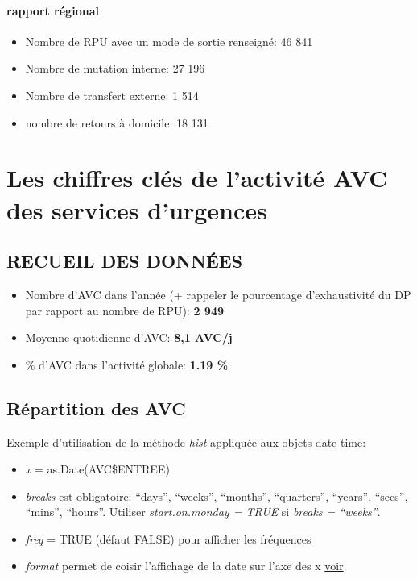 \documentclass[]{article}
\begin{document}
\paragraph{rapport régional}\label{rapport-regional}

\begin{itemize}
\itemsep1pt\parskip0pt
\item
  Nombre de RPU avec un mode de sortie renseigné: 46 841
\item
  Nombre de mutation interne: 27 196
\item
  Nombre de transfert externe: 1 514
\item
  nombre de retours à domicile: 18 131
\end{itemize}

\section{Les chiffres clés de l'activité AVC des services
d'urgences}\label{les-chiffres-cles-de-lactivite-avc-des-services-durgences}

\subsection{RECUEIL DES DONNÉES}\label{recueil-des-donnees-3}

\begin{itemize}
\itemsep1pt\parskip0pt
\item
  Nombre d'AVC dans l'année (+ rappeler le pourcentage d'exhaustivité du
  DP par rapport au nombre de RPU): \textbf{2 949}
\item
  Moyenne quotidienne d'AVC: \textbf{8,1 AVC/j}
\item
  \% d'AVC dans l'activité globale: \textbf{1.19 \%}
\end{itemize}

\subsection{Répartition des AVC}\label{repartition-des-avc}

Exemple d'utilisation de la méthode \emph{hist} appliquée aux objets
date-time:

\begin{itemize}
\itemsep1pt\parskip0pt
\item
  \emph{x} = as.Date(AVC\$ENTREE)
\item
  \emph{breaks} est obligatoire: ``days'', ``weeks'', ``months'',
  ``quarters'', ``years'', ``secs'', ``mins'', ``hours''. Utiliser
  \emph{start.on.monday = TRUE} si \emph{breaks = ``weeks''}.
\item
  \emph{freq} = TRUE (défaut FALSE) pour afficher les fréquences
\item
  \emph{format} permet de coisir l'affichage de la date sur l'axe des x
  \href{https://stat.ethz.ch/R-manual/R-devel/library/base/html/strptime.html}{voir}.
\end{itemize}
\end{document}
